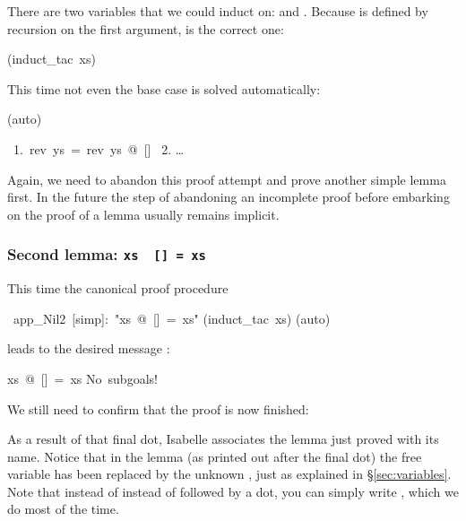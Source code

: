 \begin{isabelle}
\begin{isamarkuptxt}
There are two variables that we could induct on:  and
. Because \isa{\at} is defined by recursion on
the first argument,  is the correct one:%
\end{isamarkuptxt}%
(induct\_tac~xs)%
\begin{isamarkuptxt}%
\noindent
This time not even the base case is solved automatically:%
\end{isamarkuptxt}%
(auto)%
\begin{isamarkuptxt}%
\begin{isabellepar}%
~1.~rev~ys~=~rev~ys~@~[]\isanewline
~2. \dots
\end{isabellepar}%
Again, we need to abandon this proof attempt and prove another simple lemma first.
In the future the step of abandoning an incomplete proof before embarking on
the proof of a lemma usually remains implicit.%
\end{isamarkuptxt}%
%
\begin{isamarkuptext}%
\subsubsection*{Second lemma: \texttt{xs \at~[] = xs}}

This time the canonical proof procedure%
\end{isamarkuptext}%
~app\_Nil2~[simp]:~{"}xs~@~[]~=~xs{"}\isanewline
{}(induct\_tac~xs)\isanewline
{}(auto)%
\begin{isamarkuptxt}%
\noindent
leads to the desired message :
\begin{isabellepar}%
xs~@~[]~=~xs\isanewline
No~subgoals!
\end{isabellepar}%

We still need to confirm that the proof is now finished:%
\end{isamarkuptxt}%
%
\begin{isamarkuptext}%
\noindent{}%
As a result of that final dot, Isabelle associates the lemma
just proved with its name. Notice that in the lemma  (as
printed out after the final dot) the free variable  has been
replaced by the unknown , just as explained in
\S\ref{sec:variables}. Note that instead of instead of 
followed by a dot, you can simply write ,
which we do most of the time.


\end{isamarkuptext}
\end{isabelle}
